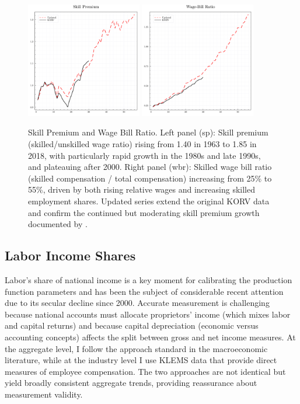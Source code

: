 \documentclass[12pt]{article}
\begin{document}
\begin{figure}[H]
 \centering
 \includegraphics[width=0.45\textwidth]{../images/sp_doc.pdf}
 \hspace*{0.05\textwidth}
 \includegraphics[width=0.45\textwidth]{../images/wbr_doc.pdf}
 \caption{\label{fig:labor_series_2} Skill Premium and Wage Bill Ratio. Left panel (sp): Skill premium (skilled/unskilled wage ratio) rising from 1.40 in 1963 to 1.85 in 2018, with particularly rapid growth in the 1980s and late 1990s, and plateauing after 2000. Right panel (wbr): Skilled wage bill ratio (skilled compensation / total compensation) increasing from 25\% to 55\%, driven by both rising relative wages and increasing skilled employment shares. Updated series extend the original KORV data and confirm the continued but moderating skill premium growth documented by \citet{autor2008trends}.}
\end{figure}


\subsection{Labor Income Shares}\label{sec:labor_share_income}

Labor's share of national income is a key moment for calibrating the production function parameters and has been the subject of considerable recent attention due to its secular decline since 2000. Accurate measurement is challenging because national accounts must allocate proprietors' income (which mixes labor and capital returns) and because capital depreciation (economic versus accounting concepts) affects the split between gross and net income measures. At the aggregate level, I follow the approach standard in the macroeconomic literature, while at the industry level I use KLEMS data that provide direct measures of employee compensation. The two approaches are not identical but yield broadly consistent aggregate trends, providing reassurance about measurement validity.
\end{document}
